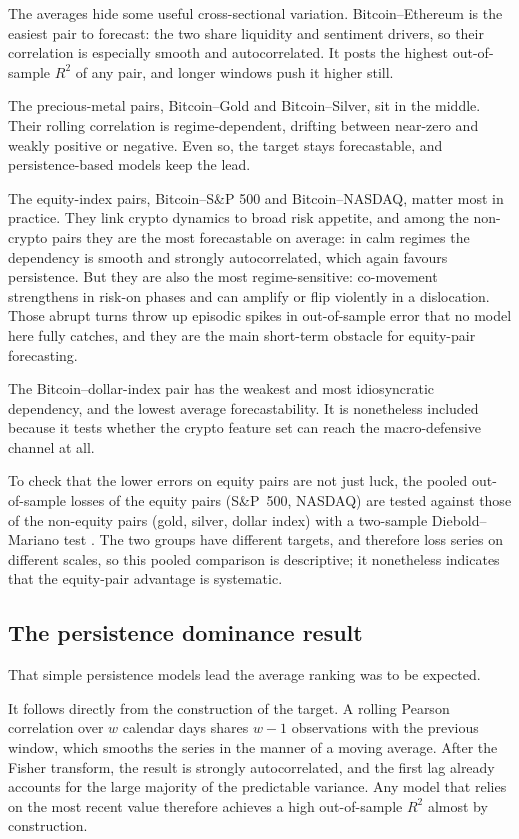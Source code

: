 The averages hide some useful cross-sectional variation. Bitcoin--Ethereum is the easiest pair to forecast: the two share liquidity and sentiment drivers, so their correlation is especially smooth and autocorrelated. It posts the highest out-of-sample $R^2$ of any pair, and longer windows push it higher still.

The precious-metal pairs, Bitcoin--Gold and Bitcoin--Silver, sit in the middle. Their rolling correlation is regime-dependent, drifting between near-zero and weakly positive or negative. Even so, the target stays forecastable, and persistence-based models keep the lead.

The equity-index pairs, Bitcoin--S\&P 500 and Bitcoin--NASDAQ, matter most in practice. They link crypto dynamics to broad risk appetite, and among the non-crypto pairs they are the most forecastable on average: in calm regimes the dependency is smooth and strongly autocorrelated, which again favours persistence. But they are also the most regime-sensitive: co-movement strengthens in risk-on phases and can amplify or flip violently in a dislocation. Those abrupt turns throw up episodic spikes in out-of-sample error that no model here fully catches, and they are the main short-term obstacle for equity-pair forecasting.

The Bitcoin--dollar-index pair has the weakest and most idiosyncratic dependency, and the lowest average forecastability. It is nonetheless included because it tests whether the crypto feature set can reach the macro-defensive channel at all.

To check that the lower errors on equity pairs are not just luck, the pooled out-of-sample losses of the equity pairs (S\&P~500, NASDAQ) are tested against those of the non-equity pairs (gold, silver, dollar index) with a two-sample Diebold--Mariano test \cite{diebold1995}. The two groups have different targets, and therefore loss series on different scales, so this pooled comparison is descriptive; it nonetheless indicates that the equity-pair advantage is systematic.

\subsection{The persistence dominance result}

That simple persistence models lead the average ranking was to be expected.

It follows directly from the construction of the target. A rolling Pearson correlation over $w$ calendar days shares $w-1$ observations with the previous window, which smooths the series in the manner of a moving average. After the Fisher transform, the result is strongly autocorrelated, and the first lag already accounts for the large majority of the predictable variance. Any model that relies on the most recent value therefore achieves a high out-of-sample $R^2$ almost by construction.

